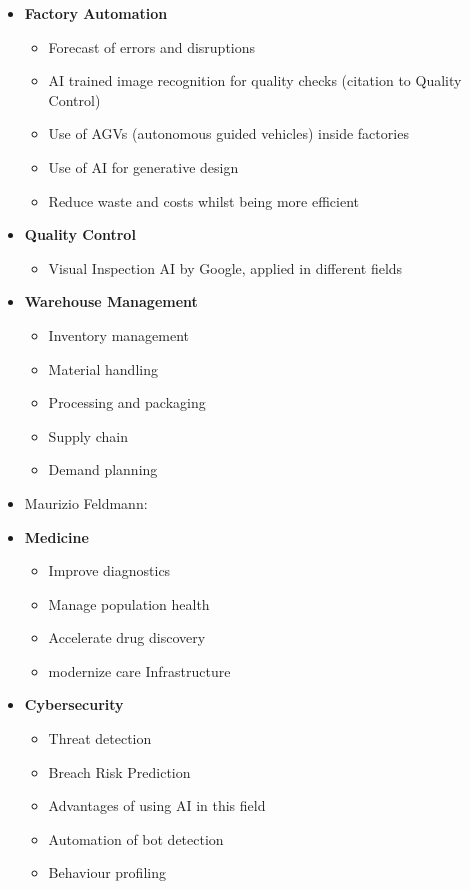 \documentclass[12pt]{article}
\begin{document}
\begin{itemize}[label=$\bullet$]
     \item \textbf{Factory Automation}
          \begin{itemize}[label=$\circ$]
         \item Forecast of errors and disruptions
         \item AI trained image recognition for quality checks (citation to Quality Control)
         \item Use of AGVs (autonomous guided vehicles) inside factories
         \item Use of AI for generative design
         \item Reduce waste and costs whilst being more efficient
     \end{itemize}
     \item \textbf{Quality Control}
     \begin{itemize}[label=$\circ$]
         \item Visual Inspection AI by Google, applied in different fields
     \end{itemize}
     \item \textbf{Warehouse Management}
     \begin{itemize}[label=$\circ$]
         \item Inventory management
         \item Material handling
         \item Processing and packaging
         \item Supply chain
         \item Demand planning
     \end{itemize}
     \item[\ding{212}] Maurizio Feldmann:
     \item \textbf{Medicine}
          \begin{itemize}[label=$\circ$]
         \item Improve diagnostics
         \item Manage population health
         \item Accelerate drug discovery
         \item modernize care Infrastructure
     \end{itemize}
     \item \textbf{Cybersecurity}
     \begin{itemize}[label=$\circ$]
         \item Threat detection
         \item Breach Risk Prediction
         \item Advantages of using AI in this field
         \item Automation of bot detection
         \item Behaviour profiling
         \end{itemize}

 \end{itemize}
\end{document}
